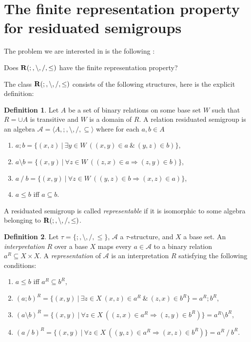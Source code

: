 \documentclass[a4paper]{article}
\theoremstyle{definition}
\newtheorem{definition}{Definition}
\theoremstyle{theorem}
\theoremstyle{proposition}
\theoremstyle{lemma}
\theoremstyle{ex}
\theoremstyle{corollary}
\theoremstyle{claim}
\begin{document}
\section{The finite representation property for residuated semigroups}

The problem we are interested in is the following \cite[Problem 19.17]{hirsch2002relation}:

\begin{center}
  Does ${\bf R}(;, \setminus, /, \leq)$ have the finite representation property?
\end{center}

The class ${\bf R}(;, \setminus, /, \leq)$ consists of the following structures, here is the explicit definition:

\begin{definition} \label{rrs}
  Let $A$ be a set of binary relations on some base set $W$ such that $R = \cup A$ is transitive and $W$ is a domain of $R$. A relation residuated semigroup is an algebra $\mathcal{A} = \langle A, ;, \setminus, /, \subseteq \rangle$ where for each $a, b \in A$
  \begin{enumerate}
    \item $a ; b = \{ (x, z) \: | \: \exists y \in W \: ((x, y) \in a \: \& \: (y, z) \in b) \}$,
    \item $a \setminus b = \{ (x, y) \: | \: \forall z \in W \: ((z, x) \in a \Rightarrow (z, y) \in b)\}$,
    \item $a \: / \: b = \{ (x, y) \: | \: \forall z \in W \: ((y, z) \in b \Rightarrow (x, z) \in a)\}$,
    \item $a \leq b$ iff $a \subseteq b$.
  \end{enumerate}
\end{definition}

A residuated semigroup is called \emph{representable} if it is isomorphic to some algebra belonging to ${\bf R}(;, \setminus, /, \leq)$.

\begin{definition}
  Let $\tau = \{ ;, \setminus, /, \leq \}$, $\mathcal{A}$ a $\tau$-structure, and $X$ a base set. An \emph{interpretation} $R$ over a base $X$ maps every $a \in \mathcal{A}$ to a binary relation $a^R \subseteq X \times X$. A \emph{representation} of $\mathcal{A}$ is an interpretation $R$ satisfying the following conditions:

  \begin{enumerate}
    \item $a \leq b$ iff $a^R \subseteq b^R$,
    \item $(a;b)^R = \{ (x, y) \: | \: \exists z \in X \: (x, z) \in a^R \: \& \: (z, x) \in b^R \} = a^R ; b^R$,
    \item $(a \setminus b)^{R} = \{ (x, y) \: | \: \forall z \in X \: ((z, x) \in a^R \Rightarrow (z, y) \in b^R)\} = a^R \setminus b^R$,
    \item $(a \: / \: b)^{R} = \{ (x, y) \: | \: \forall z \in X \: ((y, z) \in a^R \Rightarrow (x, z) \in b^R)\} = a^R \: / \: b^R$.
  \end{enumerate}
\end{definition}
\end{document}
